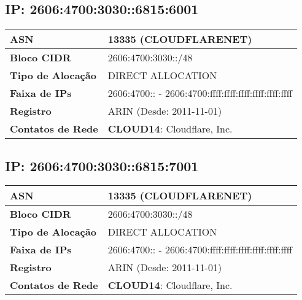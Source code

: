     \subsection{IP: 2606:4700:3030::6815:6001}
    \begin{tabular}{|l|l|}
    \hline
    \textbf{ASN} & 13335 (CLOUDFLARENET) \\ \hline
    \textbf{Bloco CIDR} & 2606:4700:3030::/48 \\ \hline
    \textbf{Tipo de Alocação} & DIRECT ALLOCATION \\ \hline
    \textbf{Faixa de IPs} & 2606:4700:: - 2606:4700:ffff:ffff:ffff:ffff:ffff:ffff \\ \hline
    \textbf{Registro} & ARIN (Desde: 2011-11-01) \\ \hline
        
\textbf{Contatos de Rede} & \textbf{CLOUD14}: Cloudflare, Inc. 
\\ \hline
\end{tabular}


    \subsection{IP: 2606:4700:3030::6815:7001}
    \begin{tabular}{|l|l|}
    \hline
    \textbf{ASN} & 13335 (CLOUDFLARENET) \\ \hline
    \textbf{Bloco CIDR} & 2606:4700:3030::/48 \\ \hline
    \textbf{Tipo de Alocação} & DIRECT ALLOCATION \\ \hline
    \textbf{Faixa de IPs} & 2606:4700:: - 2606:4700:ffff:ffff:ffff:ffff:ffff:ffff \\ \hline
    \textbf{Registro} & ARIN (Desde: 2011-11-01) \\ \hline
        
\textbf{Contatos de Rede} & \textbf{CLOUD14}: Cloudflare, Inc. 
\\ \hline
\end{tabular}
